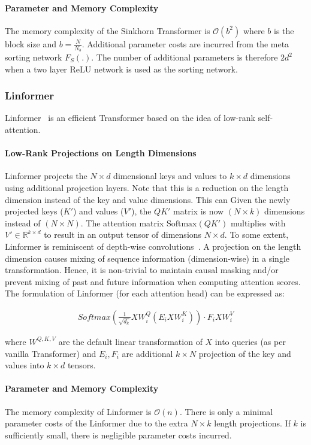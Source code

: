 \paragraph{Parameter and Memory Complexity} The memory complexity of the Sinkhorn Transformer is $\mathcal{O}(b^2)$ where $b$ is the block size and $b=\frac{N}{N_b}$. Additional parameter costs are incurred from the meta sorting network $F_S(.)$. The number of additional parameters is therefore $2d^2$ when a two layer ReLU network is used as the sorting network.

\subsubsection{Linformer}
Linformer~\citep{wang2020linformer} is an efficient Transformer based on the idea of low-rank self-attention. 
\paragraph{Low-Rank Projections on Length Dimensions} Linformer projects the $N \times d$ dimensional keys and values to $k \times d$ dimensions using additional projection layers. Note that this is a reduction on the length dimension instead of the key and value dimensions. This can Given the newly projected keys ($K'$) and values ($V'$), the $QK'$ matrix is now $(N \times k)$ dimensions instead of $(N \times N)$. The attention matrix $\text{Softmax}(QK')$ multiplies with $V' \in \mathbb{R}^{k \times d}$ to result in an output tensor of dimensions $N \times d$. To some extent, Linformer is reminiscent of depth-wise convolutions~\citep{kaiser2017depthwise}. A projection on the length dimension causes mixing of sequence information (dimension-wise) in a single transformation. Hence, it is non-trivial to maintain causal masking and/or prevent mixing of past and future information when computing attention scores. The formulation of Linformer (for each attention head) can be expressed as:

\begin{align}
Softmax(\frac{1}{\sqrt{d_k}}XW^{Q}_{i}(E_i X W_i^K)) \cdot F_iXW_i^V    
\end{align}

where $W^{Q,K,V}$ are the default linear transformation of $X$ into queries (as per vanilla Transformer) and $E_{i}, F_i$ are additional $k \times N$ projection of the key and values into $k \times d$ tensors.

\paragraph{Parameter and Memory Complexity} The memory complexity of Linformer is $\mathcal{O}(n)$. There is only a minimal parameter costs of the Linformer due to the extra $N \times k$ length projections. If $k$ is sufficiently small, there is negligible parameter costs incurred.

